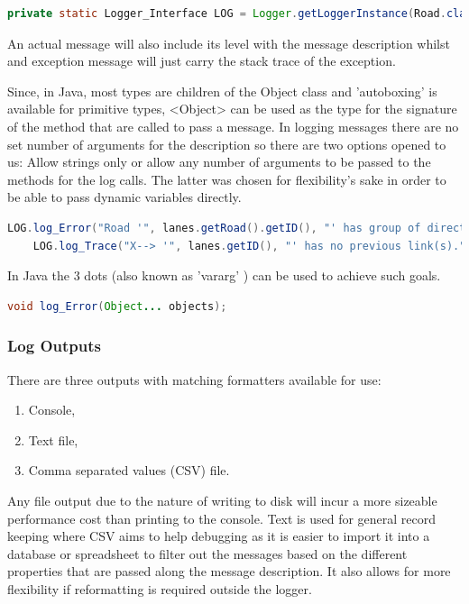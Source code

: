 \begin{lstlisting}[language=java]
	private static Logger_Interface LOG = Logger.getLoggerInstance(Road.class.getSimpleName());
\end{lstlisting}

An actual message will also include its level with the message description whilst and exception message will just carry the stack trace of the exception.

Since, in Java, most types are children of the Object class and 'autoboxing'\cite{Oracle1995} is available for primitive types, <Object> can be used as the type for the signature of the method that are called to pass a message. In logging messages there are no set number of arguments for the description so there are two options opened to us: Allow strings only or allow any number of arguments to be passed to the methods for the log calls. The latter was chosen for flexibility's sake in order to be able to pass dynamic variables directly. 

\begin{lstlisting}[language=Java]
	LOG.log_Error("Road '", lanes.getRoad().getID(), "' has group of directed lanes with partly implemented Links (Back). ", link_count, "/", lanes.getNumberOfLanes(), " Lanes connected to a link.");
	LOG.log_Trace("X--> '", lanes.getID(), "' has no previous link(s).");
\end{lstlisting} 

In Java the 3 dots (also known as 'vararg' \cite{Oracle2004}) can be used to achieve such goals.

\begin{lstlisting}[language=Java]
	void log_Error(Object... objects);
\end{lstlisting}

\subsubsection{Log Outputs}
There are three outputs with matching formatters available for use:
\begin{enumerate}
	\item Console,
	\item Text file,
	\item Comma separated values (CSV) file.
\end{enumerate}

Any file output due to the nature of writing to disk will incur a more sizeable performance cost than printing to the console. Text is used for general record keeping where CSV aims to help debugging as it is easier to import it into a database or spreadsheet to filter out the messages based on the different properties that are passed along the message description. It also allows for more flexibility if reformatting is required outside the logger.



